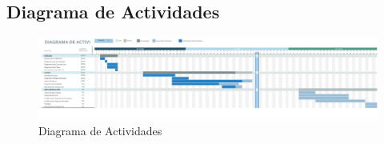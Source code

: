
\begin{landscape}

\newpage
\section{Diagrama de Actividades}

\begin{figure}[h]
\begin{center}
	\includegraphics[scale=0.55]{./resources/gantt2.png}
	\caption{Diagrama de Actividades}
	\label{fig:actdiagram}
\end{center}
\end{figure}

\end{landscape}